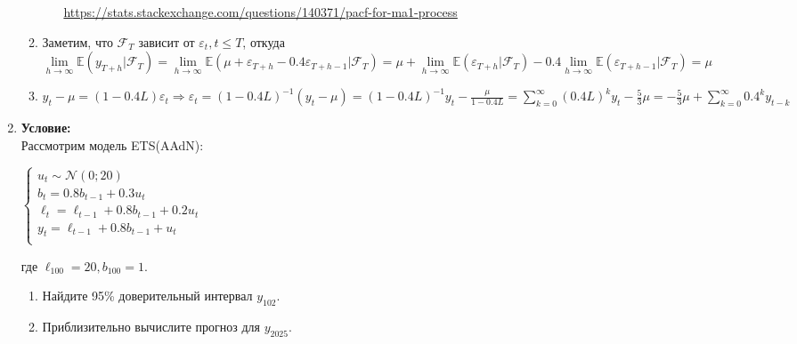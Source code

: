 \documentclass[10pt]{article}
\begin{document}
\begin{enumerate}
\begin{enumerate}
\begin{itemize}
        \url{https://stats.stackexchange.com/questions/140371/pacf-for-ma1-process}
    \end{itemize}
    \item Заметим, что $\mathcal{F}_T$ зависит от $\varepsilon_t, t\leq T$, откуда $\lim\limits_{h\rightarrow\infty}\mathbb{E}(y_{T+h}|\mathcal{F}_T) =
    \lim\limits_{h\rightarrow\infty}\mathbb{E}(\mu + \varepsilon_{T+h} - 0.4\varepsilon_{T+h-1}|\mathcal{F}_T) = \mu  +
    \lim\limits_{h\rightarrow\infty}\mathbb{E}(\varepsilon_{T+h}|\mathcal{F}_T) - 0.4\lim\limits_{h\rightarrow\infty}\mathbb{E}(\varepsilon_{T+h - 1}|\mathcal{F}_T) = \mu$
    \item $y_t - \mu = (1 - 0.4L)\varepsilon_t \Rightarrow \varepsilon_t = (1 - 0.4L)^{-1}(y_t - \mu) = (1 - 0.4L)^{-1}y_t - \frac{\mu}{1 - 0.4L} =
    \sum\limits_{k=0}^{\infty} (0.4L)^ky_t - \frac{5}{3}\mu = -\frac{5}{3}\mu + \sum\limits_{k=0}^{\infty} 0.4^k y_{t-k}$
\end{enumerate}

\item \textbf{Условие:} \\
Рассмотрим модель ETS(AAdN):\\
\begin{center}
    \begin{math}
        \begin{cases}
            u_t \sim \mathcal{N}(0; 20) \\
            b_t = 0.8b_{t-1} + 0.3u_t \\
            \ell_t = \ell_{t-1} + 0.8b_{t-1} + 0.2u_t \\
            y_t = \ell_{t-1} + 0.8b_{t-1} + u_t \\
        \end{cases}
    \end{math}
\end{center}

где $\ell_{100} = 20, b_{100} = 1$.
\begin{enumerate}
    \item Найдите 95\% доверительный интервал $y_{102}$.
    \item Приблизительно вычислите прогноз для $y_{2025}$.
\end{enumerate}


\end{enumerate}
\end{document}
